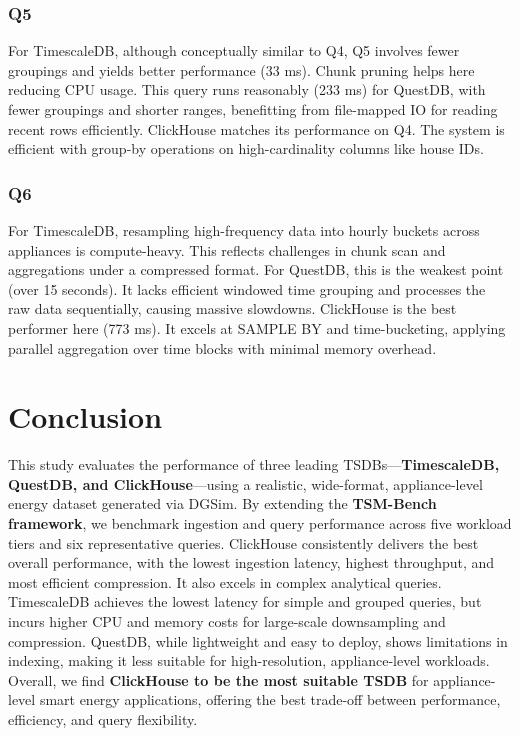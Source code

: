\documentclass[conference]{IEEEtran}
\begin{document}
\subsubsection{Q5}

For TimescaleDB, although conceptually similar to Q4, Q5 involves fewer groupings and yields better performance (33 ms). Chunk pruning helps here reducing CPU usage.
This query runs reasonably (233 ms) for QuestDB, with fewer groupings and shorter ranges, benefitting from file-mapped IO for reading recent rows efficiently.
ClickHouse matches its performance on Q4. The system is efficient with group-by operations on high-cardinality columns like house IDs.

\subsubsection{Q6}
For TimescaleDB, resampling high-frequency data into hourly buckets across appliances is compute-heavy. This reflects challenges in chunk scan and aggregations under a compressed format.
For QuestDB, this is the weakest point (over 15 seconds). It lacks efficient windowed time grouping and processes the raw data sequentially, causing massive slowdowns.
ClickHouse is the best performer here (773 ms). It excels at SAMPLE BY and time-bucketing, applying parallel aggregation over time blocks with minimal memory overhead.

\section{Conclusion}\label{sec:conclusion}
This study evaluates the performance of three leading TSDBs—\textbf{TimescaleDB, QuestDB, and ClickHouse}—using a realistic, wide-format, appliance-level energy dataset generated via DGSim. By extending the \textbf{TSM-Bench framework}, we benchmark ingestion and query performance across five workload tiers and six representative queries. ClickHouse consistently delivers the best overall performance, with the lowest ingestion latency, highest throughput, and most efficient compression. It also excels in complex analytical queries. TimescaleDB achieves the lowest latency for simple and grouped queries, but incurs higher CPU and memory costs for large-scale downsampling and compression. QuestDB, while lightweight and easy to deploy, shows limitations in indexing, making it less suitable for high-resolution, appliance-level workloads. Overall, we find \textbf{ClickHouse to be the most suitable TSDB} for appliance-level smart energy applications, offering the best trade-off between performance, efficiency, and query flexibility.
\end{document}
